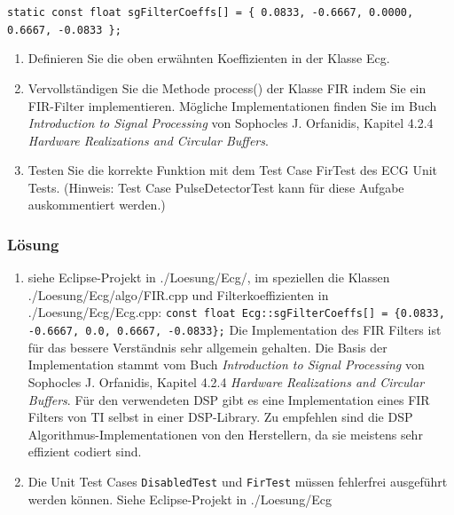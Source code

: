 \texttt{static const float sgFilterCoeffs[] = \{ 0.0833, -0.6667, 0.0000, 0.6667, -0.0833 \};}

\begin{enumerate}
  \item Definieren Sie die oben erwähnten Koeffizienten in der Klasse Ecg.
  \item  Vervollständigen Sie die Methode process() der Klasse FIR indem Sie ein FIR-Filter implementieren. Mögliche Implementationen finden Sie im Buch \textit{Introduction to Signal Processing} von Sophocles J. Orfanidis, Kapitel 4.2.4 \textit{Hardware Realizations and Circular Buffers}.
  \item Testen Sie die korrekte Funktion mit dem Test Case FirTest des ECG Unit Tests. (Hinweis: Test Case PulseDetectorTest kann für diese Aufgabe auskommentiert werden.)
\end{enumerate}

\subsubsection{Lösung}

\begin{enumerate}
  \item siehe Eclipse-Projekt in ./Loesung/Ecg/, im speziellen die Klassen ./Loesung/Ecg/algo/FIR.cpp und Filterkoeffizienten in ./Loesung/Ecg/Ecg.cpp: \texttt{const float Ecg::sgFilterCoeffs[] = \{0.0833, -0.6667, 0.0, 0.6667, -0.0833\};} Die Implementation des FIR Filters ist für das bessere Verständnis sehr allgemein gehalten. Die Basis der Implementation stammt vom Buch \textit{Introduction to Signal Processing} von Sophocles J. Orfanidis, Kapitel 4.2.4 \textit{Hardware Realizations and Circular Buffers}. Für den verwendeten DSP gibt es eine Implementation eines FIR Filters von TI selbst in einer DSP-Library. Zu empfehlen sind die DSP Algorithmus-Implementationen von den Herstellern, da sie meistens sehr effizient codiert sind.
  \item Die Unit Test Cases \texttt{DisabledTest} und \texttt{FirTest} müssen fehlerfrei ausgeführt werden können. Siehe Eclipse-Projekt in ./Loesung/Ecg
\end{enumerate}


\noindent\makebox[\linewidth]{\rule{\paperwidth}{0.4pt}}

\noindent\makebox[\linewidth]{\rule{\paperwidth}{0.4pt}}

\noindent\makebox[\linewidth]{\rule{\paperwidth}{0.4pt}}

